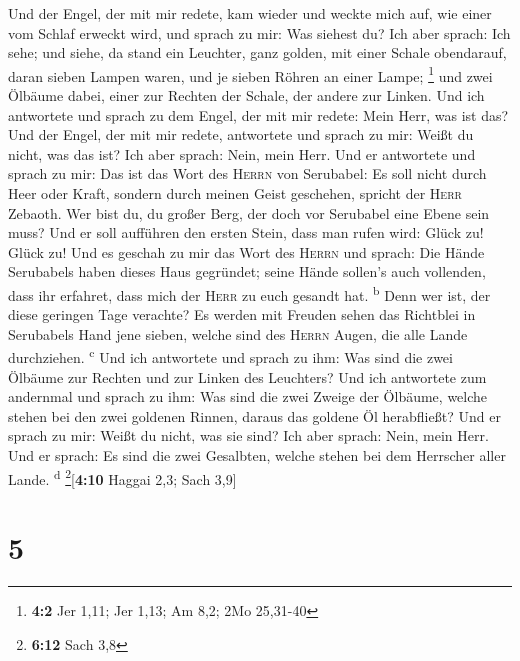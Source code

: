  Und der Engel, der mit mir redete, kam wieder und weckte
mich auf, wie einer vom Schlaf erweckt wird,  und sprach
zu mir: Was siehest du? Ich aber sprach: Ich sehe; und siehe, da stand
ein Leuchter, ganz golden, mit einer Schale obendarauf, daran sieben
Lampen waren, und je sieben Röhren an einer Lampe; \footnote{\textbf{4:2}
  Jer 1,11; Jer 1,13; Am 8,2; 2Mo 25,31-40}  und zwei
Ölbäume dabei, einer zur Rechten der Schale, der andere zur Linken.
 Und ich antwortete und sprach zu dem Engel, der mit mir
redete: Mein Herr, was ist das?  Und der Engel, der mit
mir redete, antwortete und sprach zu mir: Weißt du nicht, was das ist?
Ich aber sprach: Nein, mein Herr.  Und er antwortete und
sprach zu mir: Das ist das Wort des \textsc{Herrn} von Serubabel: Es
soll nicht durch Heer oder Kraft, sondern durch meinen Geist geschehen,
spricht der \textsc{Herr} Zebaoth.  Wer bist du, du großer
Berg, der doch vor Serubabel eine Ebene sein muss? Und er soll aufführen
den ersten Stein, dass man rufen wird: Glück zu! Glück zu!
 Und es geschah zu mir das Wort des \textsc{Herrn} und
sprach:  Die Hände Serubabels haben dieses Haus gegründet;
seine Hände sollen's auch vollenden, dass ihr erfahret, dass mich der
\textsc{Herr} zu euch gesandt hat. \textsuperscript{b} 
Denn wer ist, der diese geringen Tage verachte? Es werden mit Freuden
sehen das Richtblei in Serubabels Hand jene sieben, welche sind des
\textsc{Herrn} Augen, die alle Lande durchziehen. \textsuperscript{c}
 Und ich antwortete und sprach zu ihm: Was sind die zwei
Ölbäume zur Rechten und zur Linken des Leuchters?  Und
ich antwortete zum andernmal und sprach zu ihm: Was sind die zwei Zweige
der Ölbäume, welche stehen bei den zwei goldenen Rinnen, daraus das
goldene Öl herabfließt?  Und er sprach zu mir: Weißt du
nicht, was sie sind? Ich aber sprach: Nein, mein Herr. 
Und er sprach: Es sind die zwei Gesalbten, welche stehen bei dem
Herrscher aller Lande. \textsuperscript{d} \footnote{\textbf{6:12} Sach
  3,8}{[}\textbf{4:10} Haggai 2,3; Sach 3,9{]}

\hypertarget{section-4}{%
\section{5}\label{section-4}}

